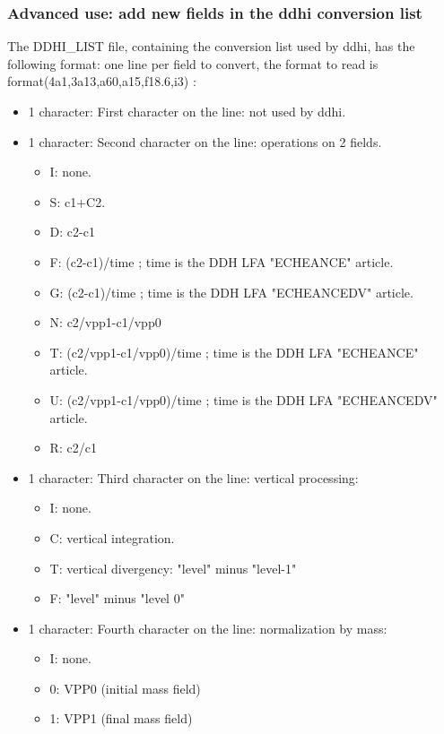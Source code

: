 \subsubsection{Advanced use: add new fields in the ddhi conversion list}

\p The DDHI\_LIST file, containing the conversion list used by ddhi, has the following format: one line per field to convert, the format to read is format(4a1,3a13,a60,a15,f18.6,i3) : 
\begin{itemize}
  [label=\textbullet]
  \item 1 character: First character on the line: not used by ddhi.
  \item 1 character: Second character on the line: operations on 2 fields.
    \begin{itemize}
      \item I: none.
      \item S: c1+C2.
      \item D: c2-c1
      \item F: (c2-c1)/time ; time is the DDH LFA "ECHEANCE" article.
      \item G: (c2-c1)/time ; time is the DDH LFA "ECHEANCEDV" article.
      \item N: c2/vpp1-c1/vpp0
      \item T: (c2/vpp1-c1/vpp0)/time ; time is the DDH LFA "ECHEANCE" article.
      \item U: (c2/vpp1-c1/vpp0)/time ; time is the DDH LFA "ECHEANCEDV" article.
      \item R: c2/c1
    \end{itemize}
  \item 1 character: Third character on the line: vertical processing:
    \begin{itemize}
      [label=\textbullet]
      \item I: none.
      \item C: vertical integration.
      \item T: vertical divergency: "level" minus "level-1"
      \item F: "level" minus "level 0"
    \end{itemize}
  \item 1 character: Fourth character on the line: normalization by mass: 
    \begin{itemize}
      [label=\textbullet]
      \item I: none.
      \item 0: VPP0 (initial mass field)
      \item 1: VPP1 (final mass field)

\end{itemize}
\end{itemize}
